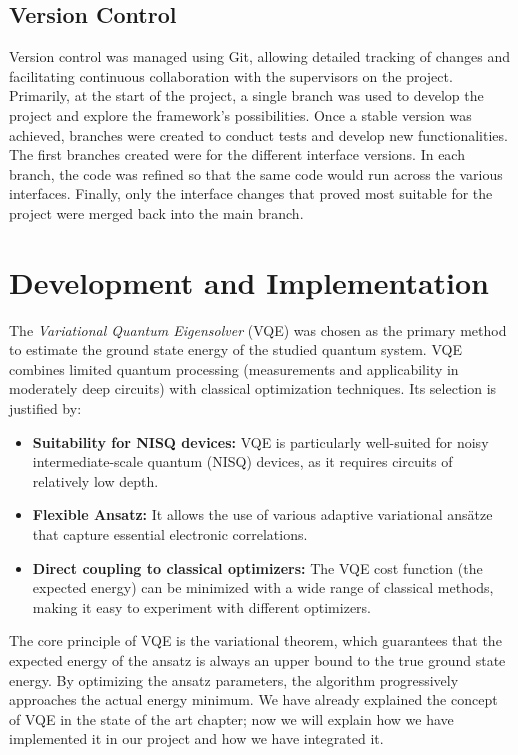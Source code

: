 \subsection{Version Control}

Version control was managed using Git, allowing detailed tracking of changes and facilitating continuous collaboration with the supervisors on the project. Primarily, at the start of the project, a single branch was used to develop the project and explore the framework's possibilities. Once a stable version was achieved, branches were created to conduct tests and develop new functionalities. The first branches created were for the different interface versions. In each branch, the code was refined so that the same code would run across the various interfaces. Finally, only the interface changes that proved most suitable for the project were merged back into the main branch.

\section{Development and Implementation}

The \textit{Variational Quantum Eigensolver} (VQE) was chosen as the primary method to estimate the ground state energy of the studied quantum system. VQE combines limited quantum processing (measurements and applicability in moderately deep circuits) with classical optimization techniques. Its selection is justified by:

\begin{itemize}
    \item \textbf{Suitability for NISQ devices:} VQE is particularly well-suited for noisy intermediate-scale quantum (NISQ) devices, as it requires circuits of relatively low depth.
    \item \textbf{Flexible Ansatz:} It allows the use of various adaptive variational ansätze that capture essential electronic correlations.
    \item \textbf{Direct coupling to classical optimizers:} The VQE cost function (the expected energy) can be minimized with a wide range of classical methods, making it easy to experiment with different optimizers.
\end{itemize}

The core principle of VQE is the variational theorem, which guarantees that the expected energy of the ansatz is always an upper bound to the true ground state energy. By optimizing the ansatz parameters, the algorithm progressively approaches the actual energy minimum. We have already explained the concept of VQE in the state of the art chapter; now we will explain how we have implemented it in our project and how we have integrated it.

